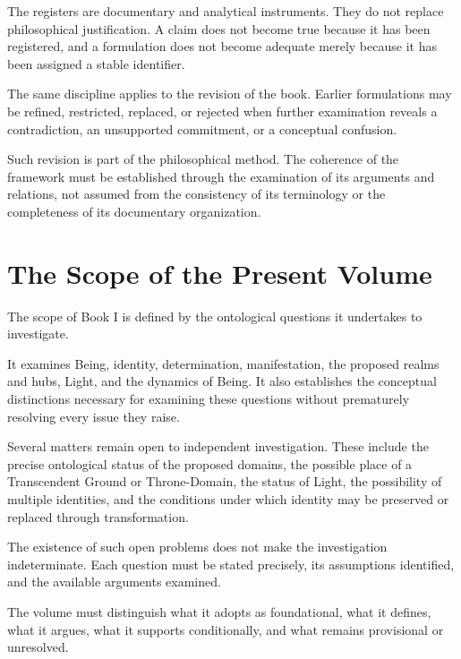 The registers are documentary and
analytical instruments. They do not
replace philosophical justification.
A claim does not become true because
it has been registered, and a
formulation does not become adequate
merely because it has been assigned
a stable identifier.

The same discipline applies to the
revision of the book. Earlier
formulations may be refined, restricted,
replaced, or rejected when further
examination reveals a contradiction,
an unsupported commitment, or a
conceptual confusion.

Such revision is part of the
philosophical method. The coherence
of the framework must be established
through the examination of its
arguments and relations, not assumed
from the consistency of its terminology
or the completeness of its documentary
organization.



\section*{The Scope of the Present Volume}

The scope of Book I is defined by
the ontological questions it undertakes
to investigate.

It examines Being, identity,
determination, manifestation, the
proposed realms and hubs, Light,
and the dynamics of Being. It also
establishes the conceptual distinctions
necessary for examining these questions
without prematurely resolving every
issue they raise.

Several matters remain open to
independent investigation. These
include the precise ontological status
of the proposed domains, the possible
place of a Transcendent Ground or
Throne-Domain, the status of Light,
the possibility of multiple identities,
and the conditions under which identity
may be preserved or replaced through
transformation.

The existence of such open problems
does not make the investigation
indeterminate. Each question must
be stated precisely, its assumptions
identified, and the available arguments
examined.

The volume must distinguish what it
adopts as foundational, what it defines,
what it argues, what it supports
conditionally, and what remains
provisional or unresolved.

